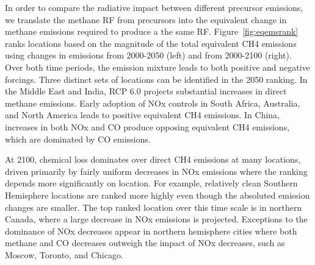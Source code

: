 In order to compare the radiative impact between different precursor emissions, we translate the methane RF from precursors into the equivalent change in methane emissions required to produce a the same RF. Figure~\ref{fig:eqemsrank} ranks locations based on the magnitude of the total equivalent CH4 emissions using changes in emissions from 2000-2050 (left) and from 2000-2100 (right). Over both time periods, the emission  mixture leads to both  positive and negative forcings. Three distinct sets of locations can be identified in the 2050 ranking. In the Middle East and India, RCP 6.0 projects substantial increases in direct methane emissions. Early adoption of NOx controls in South Africa, Australia, and North America leads to positive equivalent CH4 emissions. In China, increases in both NOx and CO produce opposing equivalent CH4 emissions, which are dominated by  CO emissions.

At 2100, chemical loss dominates over direct CH4 emissions at many locations, driven primarily by fairly uniform decreases in NOx emissions where the ranking depends more significantly on location. For example,  relatively clean Southern Hemisphere locations are ranked more highly even though the absoluted emission changes are smaller. The top ranked location over this time scale is in northern Canada, where a large decrease in NOx emissions is projected. Exceptions to the dominance of NOx decreases appear in northern hemisphere cities where both methane and CO decreases outweigh the impact of NOx decreases, such as Moscow, Toronto, and Chicago. 

